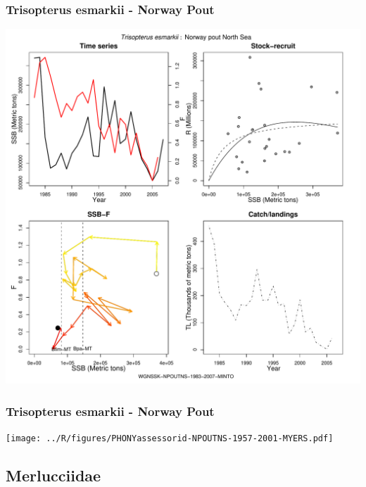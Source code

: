 \subsubsection{Trisopterus esmarkii - Norway Pout}
\begin{center}
\includegraphics[width=1.2\textwidth]{../R/figures/WGNSSK-NPOUTNS-1983-2007-MINTO.pdf}
\end{center}

\subsubsection{Trisopterus esmarkii - Norway Pout}
\begin{center}
\texttt{[image: ../R/figures/PHONYassessorid-NPOUTNS-1957-2001-MYERS.pdf]}
\end{center}

\subsection{Merlucciidae}

